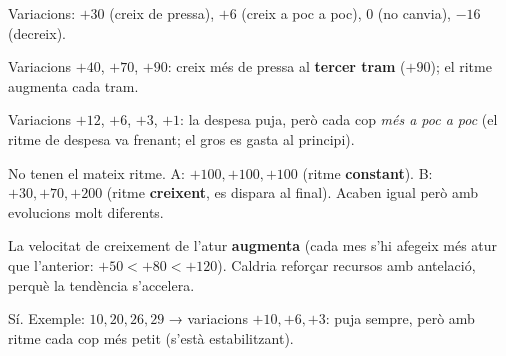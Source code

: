 \begin{solucions}
\begin{sollist}
  \item Variacions: $+30$ (creix de pressa), $+6$ (creix a poc a poc), $0$ (no canvia),
        $-16$ (decreix).
  \item Variacions $+40$, $+70$, $+90$: creix més de pressa al \textbf{tercer tram}
        ($+90$); el ritme augmenta cada tram.
  \item Variacions $+12$, $+6$, $+3$, $+1$: la despesa puja, però cada cop \emph{més a
        poc a poc} (el ritme de despesa va frenant; el gros es gasta al principi).
  \item No tenen el mateix ritme. A: $+100, +100, +100$ (ritme \textbf{constant}). B:
        $+30, +70, +200$ (ritme \textbf{creixent}, es dispara al final). Acaben igual
        però amb evolucions molt diferents.
  \item La velocitat de creixement de l'atur \textbf{augmenta} (cada mes s'hi afegeix
        més atur que l'anterior: $+50<+80<+120$). Caldria reforçar recursos amb
        antelació, perquè la tendència s'accelera.
  \item Sí. Exemple: $10, 20, 26, 29$ → variacions $+10, +6, +3$: puja sempre, però amb
        ritme cada cop més petit (s'està estabilitzant).
\end{sollist}
\end{solucions}
